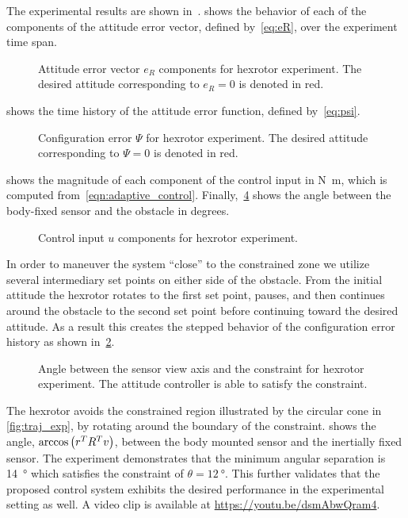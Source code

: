 The experimental results are shown in~.
 shows the behavior of each of the components of the attitude error vector, defined by~\cref{eq:eR}, over the experiment time span.
\begin{figure}[htbp]
    \centering
    
    \caption{Attitude error vector \( e_R \) components for hexrotor experiment.
    The desired attitude corresponding to \( e_R = 0 \) is denoted in red.\label{fig:eR_exp}}
\end{figure}
 shows the time history of the attitude error function, defined by~\cref{eq:psi}.
\begin{figure}[htbp]
    \centering
    
    \caption{Configuration error \( \Psi \) for hexrotor experiment.
    The desired attitude corresponding to \( \Psi = 0 \) is denoted in red.\label{fig:Psi_exp}}
\end{figure}
 shows the magnitude of each component of the control input in \si{\newton\meter}, which is computed from~\cref{eqn:adaptive_control}.
Finally,~\cref{fig:con_angle_exp} shows the angle between the body-fixed sensor and the obstacle in degrees.
\begin{figure}[htbp]
    \centering
    
    \caption{Control input \( u \) components for hexrotor experiment.\label{fig:u_exp}}
\end{figure}
In order to maneuver the system ``close'' to the constrained zone we utilize several intermediary set points on either side of the obstacle.
From the initial attitude the hexrotor rotates to the first set point, pauses, and then continues around the obstacle to the second set point before continuing toward the desired attitude.
As a result this creates the stepped behavior of the configuration error history as shown in~\cref{fig:Psi_exp}.
\begin{figure}[htbp]
    \centering
    
    \caption{Angle between the sensor view axis and the constraint for hexrotor experiment.
    The attitude controller is able to satisfy the constraint. \label{fig:con_angle_exp}}
\end{figure}

The hexrotor avoids the constrained region illustrated by the circular cone in \cref{fig:traj_exp}, by rotating around the boundary of the constraint. 
 shows the angle, \( \arccos \left( r^T R^T v \right) \), between the body mounted sensor and the inertially fixed sensor.
The experiment demonstrates that the minimum angular separation is \SI{14}{\degree} which satisfies the constraint of \( \theta = \SI{12}{\degree} \).
This further validates that the proposed control system exhibits the desired performance in the experimental setting as well. 
A video clip is available at \url{https://youtu.be/dsmAbwQram4}.

